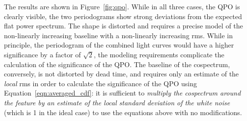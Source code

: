 \documentclass[12pt]{emulateapj}
\begin{document}
The results are shown in Figure~\ref{fig:qpo}. While in all three cases, the QPO is clearly visible, the two periodograms show strong deviations from the expected flat power spectrum. The shape is distorted and requires a precise model of the non-linearly increasing baseline with a non-linearly increasing rms. While in principle, the periodogram of the combined light curves would have a higher significance by a factor of $\sqrt{2}$, the modeling requirements complicate the calculation of the significance of the QPO. 
The baseline of the cospectrum, conversely, is not distorted by dead time, and requires only an estimate of the \textit{local} rms in order to calculate the significance of the QPO using Equation~\ref{eqn:averaged_cdf}: it is sufficient to \textit{multiply the cospectrum around the feature by an estimate of the local standard deviation of the white noise} (which is 1 in the ideal case) to use the equations above with no modifications.
\end{document}
